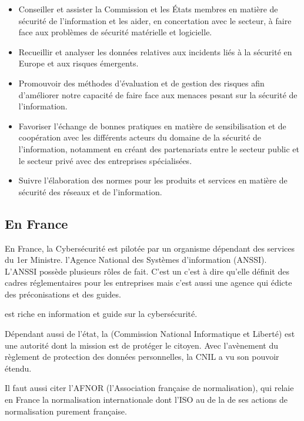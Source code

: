 \begin{itemize}
  \item Conseiller et assister la Commission et les États membres en matière de sécurité de l'information et les aider, en concertation avec le secteur, à faire face aux problèmes de sécurité matérielle et logicielle.
  \item Recueillir et analyser les données relatives aux incidents liés à la sécurité en Europe et aux risques émergents.
  \item Promouvoir des méthodes d'évaluation et de gestion des risques afin d'améliorer notre capacité de faire face aux menaces pesant sur la sécurité de l'information.
  \item Favoriser l'échange de bonnes pratiques en matière de sensibilisation et de coopération avec les différents acteurs du domaine de la sécurité de l'information, notamment en créant des partenariats entre le secteur public et le secteur privé avec des entreprises spécialisées.
  \item Suivre l'élaboration des normes pour les produits et services en matière de sécurité des réseaux et de l'information.
\end{itemize}



\subsection{En France}

En France, la Cybersécurité est pilotée par un organisme dépendant des services du 1er Ministre. l'Agence National des Systèmes d'information (ANSSI).
L'ANSSI possède plusieurs rôles de fait. C'est un  c'est à dire qu'elle définit des cadres réglementaires pour les entreprises mais c'est aussi une agence qui édicte des préconisations et des guides.

  est riche en information et guide sur la cybersécurité.

Dépendant aussi de l'état, la  (Commission National Informatique et Liberté) est une autorité dont la mission est de protéger le citoyen. Avec l'avènement du règlement de protection des données personnelles, la CNIL a vu son pouvoir étendu.  

Il faut aussi citer l'AFNOR (l'Association française de normalisation), qui relaie en France la normalisation internationale dont l'ISO au de la de ses actions de normalisation purement française.

